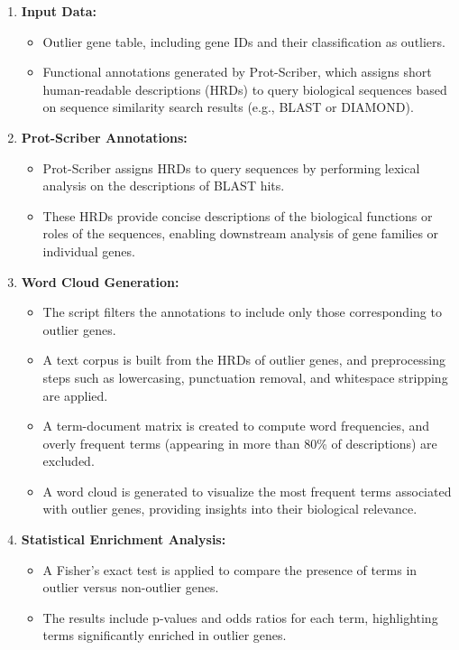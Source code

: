 \documentclass{article}
\begin{document}
\begin{enumerate}
    \item \textbf{Input Data:}
    \begin{itemize}
        \item Outlier gene table, including gene IDs and their classification as outliers.
        \item Functional annotations generated by Prot-Scriber, which assigns short human-readable descriptions (HRDs) to query biological sequences based on sequence similarity search results (e.g., BLAST or DIAMOND).
    \end{itemize}

    \item \textbf{Prot-Scriber Annotations:}
    \begin{itemize}
        \item Prot-Scriber assigns HRDs to query sequences by performing lexical analysis on the descriptions of BLAST hits.
        \item These HRDs provide concise descriptions of the biological functions or roles of the sequences, enabling downstream analysis of gene families or individual genes.
    \end{itemize}

    \item \textbf{Word Cloud Generation:}
    \begin{itemize}
        \item The script filters the annotations to include only those corresponding to outlier genes.
        \item A text corpus is built from the HRDs of outlier genes, and preprocessing steps such as lowercasing, punctuation removal, and whitespace stripping are applied.
        \item A term-document matrix is created to compute word frequencies, and overly frequent terms (appearing in more than 80\% of descriptions) are excluded.
        \item A word cloud is generated to visualize the most frequent terms associated with outlier genes, providing insights into their biological relevance.
    \end{itemize}

    \item \textbf{Statistical Enrichment Analysis:}
    \begin{itemize}
        \item A Fisher's exact test is applied to compare the presence of terms in outlier versus non-outlier genes.
        \item The results include p-values and odds ratios for each term, highlighting terms significantly enriched in outlier genes.
    \end{itemize}


\end{enumerate}
\end{document}
